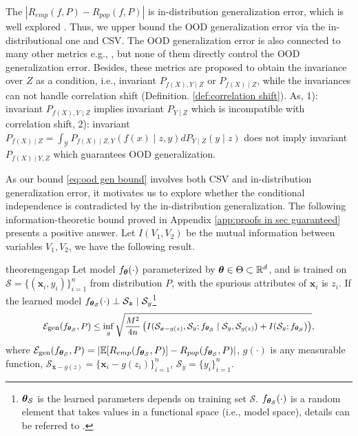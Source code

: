 \documentclass{article} %
\newcommand{\btheta}{\text{\boldmath{$\theta$}}}
\newcommand{\bz}{\boldsymbol{z}}
\newcommand{\bx}{\boldsymbol{x}}
\newcommand{\bbR}{\mathbb{R}}
\newcommand{\mE}{\mathbb{E}}
\newcommand{\cE}{\mathcal{E}}
\newcommand{\cY}{\mathcal{Y}}
\newcommand{\cS}{\mathcal{S}}
\begin{document}
	The $|R_{emp}(f,\! P) \!-\! R_{pop}(f,\! P)|$ is in-distribution generalization error, which is well explored \citep{vershynin2018}. Thus, we upper bound the OOD generalization error via the in-distributional one and CSV. The OOD generalization error is also connected to many other metrics e.g., \citep{hu2020domain,mahajan2021domain,ben2007analysis,ben2010theory,muandet2013domain,ganin2016domain}, but none of them directly control the OOD generalization error. 
	Besides, these metrics are proposed to obtain the invariance over $Z$ as a condition, i.e., invariant $P_{f(X), Y \mid Z}$ or $P_{f(X)\mid Z}$, while the invariances can not handle correlation shift (Definition. \ref{def:correlation shift}). As, 1): invariant $P_{f(X), Y \mid Z}$ implies invariant $P_{Y\mid Z}$ which is incompatible with correlation shift, 2): invariant $P_{f(X)\mid Z}=\int_{\cY} P_{f(X)\mid Z, Y}(f(x)\mid z, y)dP_{Y\mid Z}(y\mid z)$ does not imply invariant $P_{f(X)\mid Y, Z}$ which guarantees OOD generalization.    
	\par
	As our bound \eqref{eq:ood gen bound} involves both CSV and in-distribution generalization error, it motivates us to explore whether the conditional independence is contradicted by the in-distribution generalization. The following information-theoretic bound proved in Appendix \ref{app:proofs in sec guaranteed} presents a positive answer. Let $I(V_{1}, V_{2})$ be the mutual information between variables $V_{1}, V_{2}$, we have the following result. 
	\begin{restatable}{theorem}{gengap}\label{thm:gen gap}
		Let model $f_{\btheta}(\cdot)$ parameterized by $\btheta\in \Theta\subset\bbR^{d}$, and is trained on $\cS=\{(\bx_{i}, y_{i})\}_{i=1}^{n}$ from distribution $P$, with the spurious attributes of $\bx_{i}$ is $z_{i}$. If the learned model $f_{\btheta_{\cS}}(\cdot)\perp \cS_{\bz}\mid \cS_{y}$\footnote{$\btheta_{\cS}$ is the learned parameters depends on training set $\cS$. $f_{\btheta_{\cS}}(\cdot)$ is a random element that takes values in a functional space (i.e., model space), details can be referred to \citep{shiryaev2016probability}.} 
		\begin{equation}\label{eq:gen bound}
			\small
			\cE_{\text{gen}}(f_{\btheta_{\cS}}, P) \leq \inf_{g}\sqrt{\frac{M^{2}}{4n}\left(I(\cS_{\bx - g(z)}, \cS_{y}; f_{\btheta_{\cS}}\mid \cS_{y}, \cS_{g(z)}) + I(\cS_{y}; f_{\btheta_{\cS}})\right)},
		\end{equation}
		where $\cE_{\text{gen}}(f_{\btheta_{\cS}}, P) = |\mE[R_{emp}(f_{\btheta_{\cS}}, P)] - R_{pop}(f_{\btheta_{\cS}}, P)|$, $g(\cdot)$ is any measurable function, $\cS_{\bx - g(z)} = \{\bx_{i} - g(z_{i})\}_{i=1}^{n}$, $\cS_{y} = \{y_{i}\}_{i=1}^{n}$. 
	\end{restatable}
\end{document}
